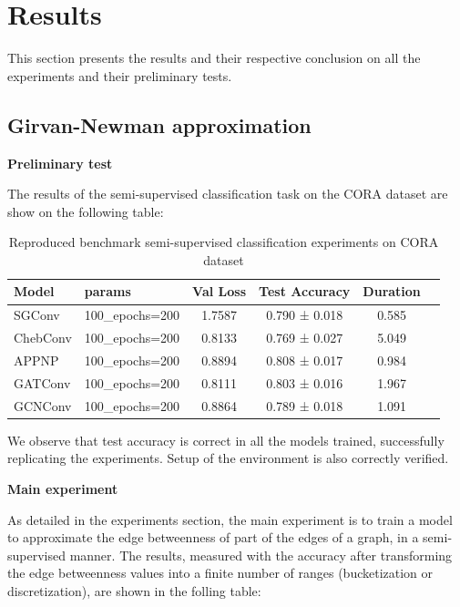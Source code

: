 \newpage
\section{Results}

This section presents the results and their respective conclusion on all the experiments and their preliminary tests.

\subsection{Girvan-Newman approximation}


\textbf{Preliminary test}

The results of the semi-supervised classification task on the CORA dataset are show on the following table:


\begin{table}[H]
\centering
\begin{tabular}{|llccc|c}
\hline
    Model &           params &   Val Loss &   Test Accuracy &   Duration \\
\hline
   SGConv &   100\_epochs=200 &     1.7587 &   0.790 ± 0.018 &      0.585 \\
 ChebConv &   100\_epochs=200 &     0.8133 &   0.769 ± 0.027 &      5.049 \\
    APPNP &   100\_epochs=200 &     0.8894 &   0.808 ± 0.017 &      0.984 \\
  GATConv &   100\_epochs=200 &     0.8111 &   0.803 ± 0.016 &      1.967 \\
  GCNConv &   100\_epochs=200 &     0.8864 &   0.789 ± 0.018 &      1.091 \\
\hline
\end{tabular}
\label{preliminar_GN}\caption{Reproduced benchmark semi-supervised classification experiments on CORA dataset }
\end{table}

We observe that test accuracy is correct in all the models trained, successfully replicating the experiments. Setup of the environment is also correctly verified.




\textbf{Main experiment}

As detailed in the experiments section, the main experiment is to train a model to approximate the edge betweenness of part of the edges of a graph, in a semi-supervised manner. The results,  measured with the accuracy after transforming the edge betweenness values into a finite number of ranges (bucketization or discretization), are shown in the folling table:

